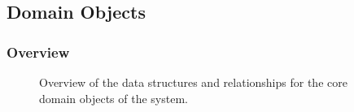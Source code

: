 \documentclass[12pt]{article}
\begin{document}
\vspace{0.2in}

\subsection{Domain Objects} %
\subsubsection{Overview}

\begin{figure}[H]
\centering	
{}
\caption{Overview of the data structures and relationships for the core domain objects of the
system.}
\end{figure}
\end{document}
